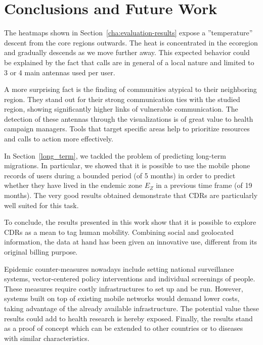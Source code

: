
\chapter{Conclusions and Future Work}
\label{cha:conclusions}

The heatmaps shown in Section~\cref{cha:evaluation-results} expose a ''temperature'' descent from the core regions outwards. The heat is concentrated in the ecoregion and gradually descends as we move further away. This expected behavior could be explained by the fact that calls are in general of a local nature and limited to 3 or 4 main antennas used per user.

A more surprising fact is the finding of communities atypical to their neighboring region. They stand out for their strong communication ties with the studied region, showing significantly higher links of vulnerable communication. The detection of these antennas through the visualizations is of great value to health campaign managers. Tools that target specific areas help to prioritize resources and calls to action more effectively.

In Section~\cref{long_term}, we tackled the problem of predicting long-term migrations. In particular, we showed that it is possible to use the mobile phone records of users during a bounded period (of 5 months) in order to predict whether they have lived in the endemic zone $E_Z$ in a previous time frame (of 19 months).
The very good results obtained demonstrate that CDRs are particularly well suited for this task.

To conclude, the results presented in this work show that it is possible to explore CDRs as a mean to tag human mobility. Combining social and geolocated information, the data at hand has been given an innovative use, different from its original billing purpose.

Epidemic counter-measures nowadays include setting national surveillance systems, vector-centered policy interventions and individual screenings of people. These measures require costly infrastructures to set up and be run. However, systems built on top of existing mobile networks would demand lower costs, taking advantage of the already available infrastructure. The potential value these results could add to health research is hereby exposed.
Finally, the results stand as a proof of concept which can be extended to other countries or to diseases with similar characteristics.



